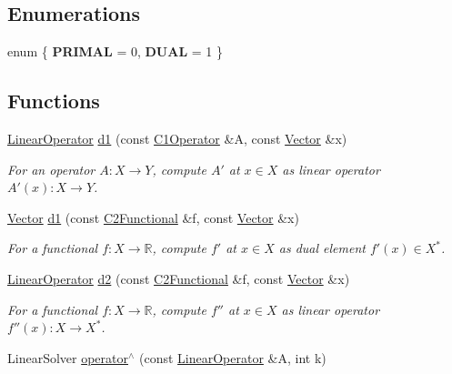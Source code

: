 \subsection*{\-Enumerations}
\begin{DoxyCompactItemize}
\item 
enum \{ {\bfseries \-P\-R\-I\-M\-A\-L} = 0, 
{\bfseries \-D\-U\-A\-L} = 1
 \}
\end{DoxyCompactItemize}
\subsection*{\-Functions}
\begin{DoxyCompactItemize}
\item 
\hyperlink{classSpacy_1_1LinearOperator}{\-Linear\-Operator} \hyperlink{namespaceSpacy_a2205e2a2c4bb5242665bbc09929d35d2}{d1} (const \hyperlink{classSpacy_1_1C1Operator}{\-C1\-Operator} \&\-A, const \hyperlink{classSpacy_1_1Vector}{\-Vector} \&x)
\begin{DoxyCompactList}\small\item\em \-For an operator $ A: X\to Y $, compute $A'$ at $x\in X$ as linear operator $ A'(x): X \to Y $. \end{DoxyCompactList}\item 
\hyperlink{classSpacy_1_1Vector}{\-Vector} \hyperlink{namespaceSpacy_ab6646eb7068eb9f1369e639cf0b620a2}{d1} (const \hyperlink{classSpacy_1_1C2Functional}{\-C2\-Functional} \&f, const \hyperlink{classSpacy_1_1Vector}{\-Vector} \&x)
\begin{DoxyCompactList}\small\item\em \-For a functional $ f: X\to \mathbb{R} $, compute $f'$ at $x\in X$ as dual element $ f'(x) \in X^* $. \end{DoxyCompactList}\item 
\hyperlink{classSpacy_1_1LinearOperator}{\-Linear\-Operator} \hyperlink{namespaceSpacy_a569d8fc0b4a0e292f257dd6307a25c8f}{d2} (const \hyperlink{classSpacy_1_1C2Functional}{\-C2\-Functional} \&f, const \hyperlink{classSpacy_1_1Vector}{\-Vector} \&x)
\begin{DoxyCompactList}\small\item\em \-For a functional $ f: X\to \mathbb{R} $, compute $f''$ at $x\in X$ as linear operator $ f''(x): X \to X^* $. \end{DoxyCompactList}\item 
\hypertarget{namespaceSpacy_ab1be097dacbf27785979de79ed5b3178}{\-Linear\-Solver \hyperlink{namespaceSpacy_ab1be097dacbf27785979de79ed5b3178}{operator$^\wedge$} (const \hyperlink{classSpacy_1_1LinearOperator}{\-Linear\-Operator} \&\-A, int k)}\label{namespaceSpacy_ab1be097dacbf27785979de79ed5b3178}


\end{DoxyCompactItemize}
